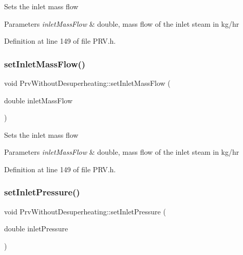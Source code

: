 Sets the inlet mass flow


\begin{DoxyParams}{Parameters}
{\em inlet\+Mass\+Flow} & double, mass flow of the inlet steam in kg/hr \\
\hline
\end{DoxyParams}


Definition at line 149 of file P\+R\+V.\+h.

\mbox{\label{class_prv_without_desuperheating_abeccff2dc91144452b34ca343ee63fa7}} 
\subsubsection{\texorpdfstring{set\+Inlet\+Mass\+Flow()}{setInletMassFlow()}\hspace{0.1cm}{\footnotesize\ttfamily [3/3]}}
{\footnotesize\ttfamily void Prv\+Without\+Desuperheating\+::set\+Inlet\+Mass\+Flow (\begin{DoxyParamCaption}\item[{double}]{inlet\+Mass\+Flow }\end{DoxyParamCaption})\hspace{0.3cm}{\ttfamily [inline]}}

Sets the inlet mass flow


\begin{DoxyParams}{Parameters}
{\em inlet\+Mass\+Flow} & double, mass flow of the inlet steam in kg/hr \\
\hline
\end{DoxyParams}


Definition at line 149 of file P\+R\+V.\+h.

\mbox{\label{class_prv_without_desuperheating_a26039a0a228ca66f96e8402bf741b9d9}} 
\subsubsection{\texorpdfstring{set\+Inlet\+Pressure()}{setInletPressure()}\hspace{0.1cm}{\footnotesize\ttfamily [1/3]}}
{\footnotesize\ttfamily void Prv\+Without\+Desuperheating\+::set\+Inlet\+Pressure (\begin{DoxyParamCaption}\item[{double}]{inlet\+Pressure }\end{DoxyParamCaption})\hspace{0.3cm}{\ttfamily [inline]}}

